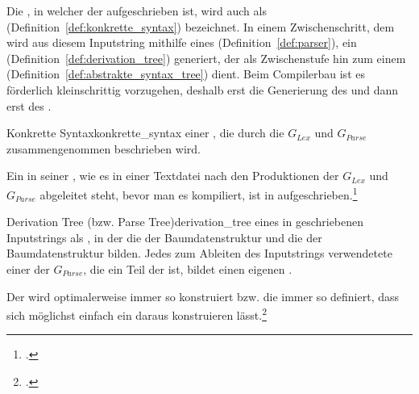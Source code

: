 
Die , in welcher der  aufgeschrieben ist, wird auch als  (Definition~\ref{def:konkrette_syntax}) bezeichnet. In einem Zwischenschritt, dem  wird aus diesem Inputstring mithilfe eines  (Definition~\ref{def:parser}), ein  (Definition~\ref{def:derivation_tree}) generiert, der als Zwischenstufe hin zum einem  (Definition~\ref{def:abstrakte_syntax_tree}) dient. Beim Compilerbau ist es förderlich kleinschrittig vorzugehen, deshalb erst die Generierung des  und dann erst des .

\begin{Definition}{Konkrette Syntax}{konkrette_syntax}
   einer , die durch die  $G_{Lex}$ und $G_{Parse}$ zusammengenommen beschrieben wird.

  Ein  in seiner , wie es in einer Textdatei nach den Produktionen der  $G_{Lex}$ und $G_{Parse}$ abgeleitet steht, bevor man es kompiliert, ist in  aufgeschrieben.\footcite{g_siek_course_2022}
\end{Definition}

\begin{Definition}{Derivation Tree (bzw. Parse Tree)}{derivation_tree}
   eines in  geschriebenen Inputstrings als , in der  die  der Baumdatenstruktur und  die  der Baumdatenstruktur bilden. Jedes zum Ableiten des Inputstrings verwendetete  einer  der  $G_{Parse}$, die ein Teil der  ist,  bildet einen eigenen .

  Der  wird optimalerweise immer so konstruiert bzw. die  immer so definiert, dass sich möglichst einfach ein  daraus konstruieren lässt.\footcite{noauthor_json_nodate}
\end{Definition}


